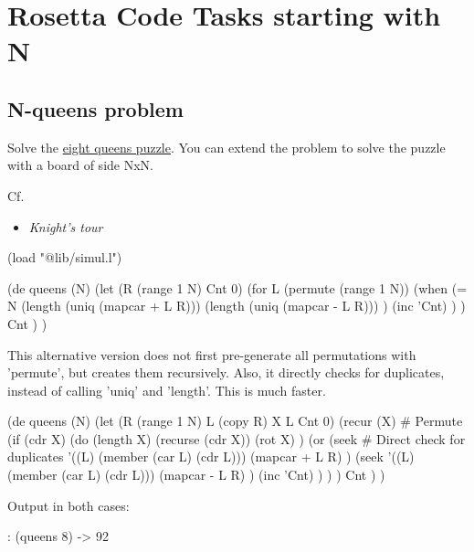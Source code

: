%
%
%

\chapter{Rosetta Code Tasks starting with N}

\section*{N-queens problem}

Solve the
\href{http://en.wikipedia.org/wiki/Eight\_queens\_puzzle}{eight queens
  puzzle}. You can extend the problem to solve the puzzle with a board
of side NxN.

Cf.

\begin{itemize}
\item
  \emph{Knight's tour}
\end{itemize}



\begin{wideverbatim}

(load "@lib/simul.l")

(de queens (N)
   (let (R (range 1 N)  Cnt 0)
      (for L (permute (range 1 N))
         (when
            (= N
               (length (uniq (mapcar + L R)))
               (length (uniq (mapcar - L R))) )
            (inc 'Cnt) ) )
      Cnt ) )

This alternative version does not first pre-generate all permutations with
'permute', but creates them recursively. Also, it directly checks for
duplicates, instead of calling 'uniq' and 'length'. This is much faster.

(de queens (N)
   (let (R (range 1 N)  L (copy R)  X L  Cnt 0)
      (recur (X)  # Permute
         (if (cdr X)
            (do (length X)
               (recurse (cdr X))
               (rot X) )
            (or
               (seek  # Direct check for duplicates
                  '((L) (member (car L) (cdr L)))
                  (mapcar + L R) )
               (seek
                  '((L) (member (car L) (cdr L)))
                  (mapcar - L R) )
               (inc 'Cnt) ) ) )
      Cnt ) )

Output in both cases:

: (queens 8)
-> 92

\end{wideverbatim}


